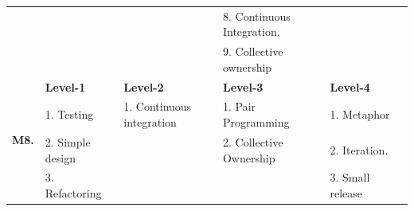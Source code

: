 \documentclass[a4paper,oneside]{bth}
\begin{document}
\begin{longtable}{|p{1.3cm}|p{2cm}|p{2cm}|p{2.7cm}|p{2cm} |p{2cm} |}
				&                                                      & \multirow{2}{*}{}                                           & 8. Continuous Integration.                                                                          &                                                        &                                                                                              \\ \cline{4-4}
				&                                                      &                                                             & 9. Collective ownership                                                                             &                                                        &                                                                                              \\ \hline
				\multirow{6}{*}{\textbf{M8.}}  & \textbf{Level-1}                                     & \textbf{Level-2}                                            & \textbf{Level-3}                                                                                    & \textbf{Level-4}                                       & \textbf{}                                                                                    \\ \cline{2-6} 
				& 1. Testing                                           & 1. Continuous integration                                   & 1. Pair Programming                                                                                 & 1. Metaphor                                            & \multirow{5}{*}{}                                                                            \\ \cline{2-5}
				& 2. Simple design                                     & \multirow{4}{*}{}                                           & 2. Collective Ownership                                                                             & 2. Iteration.                                          &                                                                                              \\ \cline{2-2} \cline{4-5}
				& 3. Refactoring                                       &                                                             & \multirow{3}{*}{}                                                                                   & 3. Small release                                       &                                                                                              \\ \cline{2-2} \cline{5-5}

\end{longtable}
\end{document}
